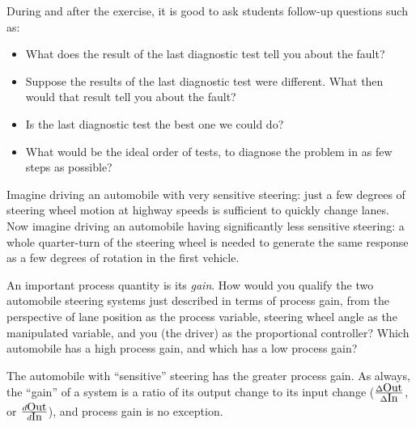During and after the exercise, it is good to ask students follow-up questions such as:

\begin{itemize}
\item{} What does the result of the last diagnostic test tell you about the fault?
\item{} Suppose the results of the last diagnostic test were different.  What then would that result tell you about the fault?
\item{} Is the last diagnostic test the best one we could do?
\item{} What would be the ideal order of tests, to diagnose the problem in as few steps as possible?
\end{itemize}






Imagine driving an automobile with very sensitive steering: just a few degrees of steering wheel motion at highway speeds is sufficient to quickly change lanes.  Now imagine driving an automobile having significantly less sensitive steering: a whole quarter-turn of the steering wheel is needed to generate the same response as a few degrees of rotation in the first vehicle.

An important process quantity is its {\it gain}.  How would you qualify the two automobile steering systems just described in terms of process gain, from the perspective of lane position as the process variable, steering wheel angle as the manipulated variable, and you (the driver) as the proportional controller?  Which automobile has a high process gain, and which has a low process gain?







The automobile with ``sensitive'' steering has the greater process gain.  As always, the ``gain'' of a system is a ratio of its output change to its input change ($\Delta \hbox{Out} \over \Delta \hbox{In}$, or $d \hbox{Out} \over d \hbox{In}$), and process gain is no exception.

